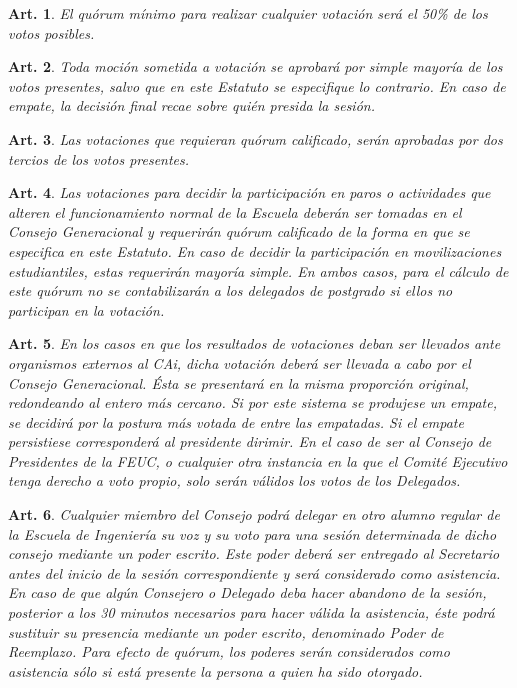 \documentclass[letterpaper,11pt]{article}
\theoremstyle{plain}
\newtheorem{art}{Art.} %
\begin{document}
			\begin{art}\label{quorumMinimoVotacion}
				El quórum mínimo para realizar cualquier votación será el 50\% de los votos posibles.
			\end{art}

			\begin{art}\label{esquemaVotacion}
				Toda moción sometida a votación se aprobará por simple mayoría de los votos presentes, salvo que en este Estatuto se especifique lo contrario. En caso de empate, la decisión final recae sobre quién presida la sesión.
			\end{art}

			\begin{art}\label{quorumCalificado}
				Las votaciones que requieran quórum calificado, serán aprobadas por dos tercios de los votos presentes.
			\end{art}

			\begin{art}\label{votacionMovilizacionParo}
				Las votaciones para decidir la participación en paros o actividades que alteren el funcionamiento normal de la Escuela deberán ser tomadas en el Consejo Generacional y requerirán quórum calificado de la forma en que se especifica en este Estatuto. En caso de decidir la participación en movilizaciones estudiantiles, estas requerirán mayoría simple. En ambos casos, para el cálculo de este quórum no se contabilizarán a los delegados de postgrado si ellos no participan en la votación.  
			\end{art}

			\begin{art}\label{votacionExterna}
				En los casos en que los resultados de votaciones deban ser llevados ante organismos externos al CAi, dicha votación deberá ser llevada a cabo por el Consejo Generacional. Ésta se presentará en la misma proporción original, redondeando al entero más cercano. Si por este sistema se produjese un empate, se decidirá por la postura más votada de entre las empatadas. Si el empate persistiese corresponderá al presidente dirimir. En el caso de ser al Consejo de Presidentes de la FEUC, o cualquier otra instancia en la que el Comité Ejecutivo tenga derecho a voto propio, solo serán válidos los votos de los Delegados.
			\end{art}

			\begin{art}\label{definicionPoder}
				Cualquier miembro del Consejo podrá delegar en otro alumno regular de la Escuela de Ingeniería su voz y su voto para una sesión determinada de dicho consejo mediante un poder escrito. Este poder deberá ser entregado al Secretario antes del inicio de la sesión correspondiente y será considerado como asistencia. En caso de que algún Consejero o Delegado deba hacer abandono de la sesión, posterior a los 30 minutos necesarios para hacer válida la asistencia, éste podrá sustituir su presencia mediante un poder escrito, denominado Poder de Reemplazo. Para efecto de quórum, los poderes serán considerados como asistencia sólo si está presente la persona a quien ha sido otorgado.
			\end{art}
\end{document}
